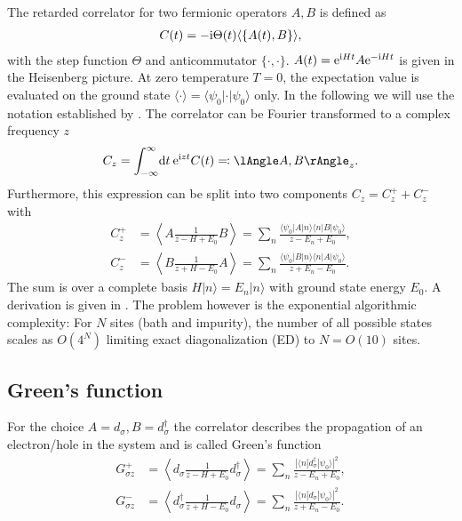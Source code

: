 The retarded correlator for two fermionic operators $A, B$ is defined as
\begin{align}
    C(t) = -\mathrm{i} \Theta(t) \langle\{A(t), B\}\rangle,
\end{align}
with the step function $\Theta$ and anticommutator $\{\cdot,\cdot\}$.
$A(t) = \mathrm{e}^{\mathrm{i} H t} A \mathrm{e}^{-\mathrm{i} H t}$ is given in the Heisenberg picture.
At zero temperature $T=0$, the expectation value is evaluated on the ground state
$\langle\cdot\rangle = \langle\psi_0 | \cdot | \psi_0\rangle$ only.
In the following we will use the notation established by \cite{Bulla1998}.
The correlator can be Fourier transformed to
a complex frequency $z$
\begin{equation}
    C_z = \int_{-\infty}^\infty\! \md t\> \me^{\mi zt} C(t) \eqqcolon \lAngle A, B \rAngle_z.
\end{equation}
Furthermore, this expression can be split into two components $C_z = C^+_z + C^-_z$ with
\begin{subequations}
    \begin{align}
        C^+_z
         & =
        \left\langle A \frac{1}{z - H + E_0} B\right\rangle
        =
        \sum_n \frac{\langle\psi_0 | A | n\rangle\langle n | B | \psi_0\rangle}{z - E_n + E_0}, \\
        C^-_z
         & =
        \left\langle B \frac{1}{z + H - E_0} A\right\rangle
        =
        \sum_n \frac{\langle\psi_0 | B | n\rangle\langle n | A | \psi_0\rangle}{z + E_n - E_0}.
    \end{align}
\end{subequations}
The sum is over a complete basis $H|n\rangle = E_n|n\rangle$ with ground state energy $E_0$.
A derivation is given in .
The problem however is the exponential algorithmic complexity:
For $N$ sites (bath and impurity), the number of all possible states scales as $O(4^N)$
limiting exact diagonalization (ED) to $N=O(10)$ sites.

\subsection{Green's function}

For the choice $A=d_\sigma, B=d_\sigma^\dag$ the correlator describes
the propagation of an electron/hole in the system and is called Green's function
\begin{subequations}
    \begin{align}
        G^+_{\sigma z}
         & =
        \left\langle d_\sigma \frac{1}{z - H + E_0} d_\sigma^\dag\right\rangle
        =
        \sum_n \frac{|\langle n | d_\sigma^\dag | \psi_0\rangle|^2}{z - E_n + E_0},
        \label{eq:Greens-function-plus} \\
        G^-_{\sigma z}
         & =
        \left\langle d_\sigma^\dag \frac{1}{z + H - E_0} d_\sigma\right\rangle
        =
        \sum_n \frac{|\langle n | d_\sigma | \psi_0\rangle|^2}{z + E_n - E_0}.
        \label{eq:Greens-function-minus}
    \end{align}
\end{subequations}

